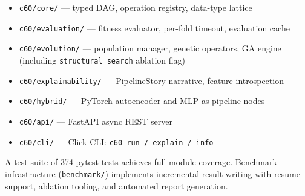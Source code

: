 \documentclass{article}
\theoremstyle{definition}
\theoremstyle{plain}
\theoremstyle{remark}
\begin{document}
\begin{itemize}
  \item \texttt{c60/core/} — typed DAG, operation registry, data-type lattice
  \item \texttt{c60/evaluation/} — fitness evaluator, per-fold timeout,
        evaluation cache
  \item \texttt{c60/evolution/} — population manager, genetic operators,
        GA engine (including \texttt{structural\_search} ablation flag)
  \item \texttt{c60/explainability/} — PipelineStory narrative,
        feature introspection
  \item \texttt{c60/hybrid/} — PyTorch autoencoder and MLP as pipeline nodes
  \item \texttt{c60/api/} — FastAPI async REST server
  \item \texttt{c60/cli/} — Click CLI: \texttt{c60 run / explain / info}
\end{itemize}

A test suite of 374 pytest tests achieves full module coverage.
Benchmark infrastructure (\texttt{benchmark/}) implements incremental
result writing with resume support, ablation tooling, and automated
report generation.
\end{document}
